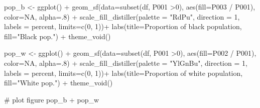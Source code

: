 \documentclass[
  letterpaper,
  DIV=11,
  numbers=noendperiod]{scrreprt}
\newenvironment{Shaded}{\begin{snugshade}}{\end{snugshade}}
\newcommand{\AttributeTok}[1]{\textcolor[rgb]{0.40,0.45,0.13}{#1}}
\newcommand{\CommentTok}[1]{\textcolor[rgb]{0.37,0.37,0.37}{#1}}
\newcommand{\ConstantTok}[1]{\textcolor[rgb]{0.56,0.35,0.01}{#1}}
\newcommand{\DecValTok}[1]{\textcolor[rgb]{0.68,0.00,0.00}{#1}}
\newcommand{\FunctionTok}[1]{\textcolor[rgb]{0.28,0.35,0.67}{#1}}
\newcommand{\NormalTok}[1]{\textcolor[rgb]{0.00,0.23,0.31}{#1}}
\newcommand{\OtherTok}[1]{\textcolor[rgb]{0.00,0.23,0.31}{#1}}
\newcommand{\SpecialCharTok}[1]{\textcolor[rgb]{0.37,0.37,0.37}{#1}}
\newcommand{\StringTok}[1]{\textcolor[rgb]{0.13,0.47,0.30}{#1}}
\begin{document}
\begin{Shaded}
\begin{Highlighting}[]
\NormalTok{pop\_b }\OtherTok{\textless{}{-}} \FunctionTok{ggplot}\NormalTok{() }\SpecialCharTok{+}
  \FunctionTok{geom\_sf}\NormalTok{(}\AttributeTok{data=}\FunctionTok{subset}\NormalTok{(df, P001 }\SpecialCharTok{\textgreater{}}\DecValTok{0}\NormalTok{), }\FunctionTok{aes}\NormalTok{(}\AttributeTok{fill=}\NormalTok{P003 }\SpecialCharTok{/}\NormalTok{ P001), }\AttributeTok{color=}\ConstantTok{NA}\NormalTok{, }\AttributeTok{alpha=}\NormalTok{.}\DecValTok{8}\NormalTok{) }\SpecialCharTok{+}
  \FunctionTok{scale\_fill\_distiller}\NormalTok{(}\AttributeTok{palette =} \StringTok{"RdPu"}\NormalTok{, }\AttributeTok{direction =} \DecValTok{1}\NormalTok{, }\AttributeTok{labels =}\NormalTok{ percent, }\AttributeTok{limits=}\FunctionTok{c}\NormalTok{(}\DecValTok{0}\NormalTok{, }\DecValTok{1}\NormalTok{))}\SpecialCharTok{+}
  \FunctionTok{labs}\NormalTok{(}\AttributeTok{title=}\StringTok{\textquotesingle{}Proportion of black population\textquotesingle{}}\NormalTok{, }\AttributeTok{fill=}\StringTok{"Black pop."}\NormalTok{) }\SpecialCharTok{+}
  \FunctionTok{theme\_void}\NormalTok{()}

\NormalTok{pop\_w }\OtherTok{\textless{}{-}} \FunctionTok{ggplot}\NormalTok{() }\SpecialCharTok{+}
  \FunctionTok{geom\_sf}\NormalTok{(}\AttributeTok{data=}\FunctionTok{subset}\NormalTok{(df, P001 }\SpecialCharTok{\textgreater{}}\DecValTok{0}\NormalTok{), }\FunctionTok{aes}\NormalTok{(}\AttributeTok{fill=}\NormalTok{P002 }\SpecialCharTok{/}\NormalTok{ P001), }\AttributeTok{color=}\ConstantTok{NA}\NormalTok{, }\AttributeTok{alpha=}\NormalTok{.}\DecValTok{8}\NormalTok{) }\SpecialCharTok{+}
  \FunctionTok{scale\_fill\_distiller}\NormalTok{(}\AttributeTok{palette =} \StringTok{"YlGnBu"}\NormalTok{, }\AttributeTok{direction =} \DecValTok{1}\NormalTok{, }\AttributeTok{labels =}\NormalTok{ percent, }\AttributeTok{limits=}\FunctionTok{c}\NormalTok{(}\DecValTok{0}\NormalTok{, }\DecValTok{1}\NormalTok{))}\SpecialCharTok{+}
  \FunctionTok{labs}\NormalTok{(}\AttributeTok{title=}\StringTok{\textquotesingle{}Proportion of white population\textquotesingle{}}\NormalTok{, }\AttributeTok{fill=}\StringTok{"White pop."}\NormalTok{) }\SpecialCharTok{+}
  \FunctionTok{theme\_void}\NormalTok{()}

\CommentTok{\# plot figure}
\NormalTok{pop\_b }\SpecialCharTok{+}\NormalTok{ pop\_w}
\end{Highlighting}
\end{Shaded}
\end{document}
